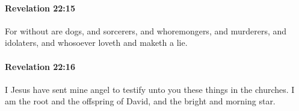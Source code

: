 		\paragraph{Revelation 22:15} %
			\label{REVELATIONNT-22-15}

			For without are dogs, and sorcerers, and whoremongers, and murderers, and idolaters, and whosoever loveth and maketh a lie.

			\begin{framed}
			\scriptsize
				\begin{compactdesc}
					\item[SBLG] 
				\end{compactdesc}
			\end{framed}

		\paragraph{Revelation 22:16} %
			\label{REVELATIONNT-22-16}

			I Jesus have sent mine angel to testify unto you these things in the churches. I am the root and the offspring of David, and the bright and morning star.

